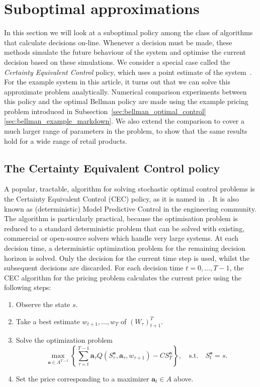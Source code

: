 \documentclass[main.tex]{subfiles}
\begin{document}
\listoftodos

\section{Suboptimal
  approximations}\label{sec:suboptimal_approximations}
In this section we will look at a suboptimal policy among the class of
algorithms that calculate decisions on-line.
Whenever a decision must be made, these methods simulate the future
behaviour of the system and optimise the current decision based on
these simulations.
We consider a special case called the
\emph{Certainty Equivalent Control} policy, which uses a point
estimate of the system~\cite[Ch.~6]{bertsekas2005dynamic}.
For the example system in this article, it turns out that we can solve
this approximate problem analytically.
Numerical comparison experiments between this policy and the optimal
Bellman policy are
made using the example pricing problem introduced in
Subsection~\ref{sec:bellman_optimal_control}\ref{sec:bellman_example_markdown}. We also extend the comparison to
cover a much larger range of parameters in the problem, to show that
the same results hold for a wide range of retail products.

\subsection{The Certainty Equivalent Control policy}
A popular, tractable, algorithm for solving stochastic optimal control
problems is the Certainty Equivalent Control (CEC) policy, as it is
named in~\cite{bertsekas2005dynamic}.
It is also known as (deterministic) Model
Predictive Control in the engineering community.
The algorithm is particularly practical, because the optimisation
problem is reduced to a standard deterministic problem that can
be solved with existing, commercial or open-source solvers which
handle very large systems.
At each decision time, a deterministic optimization problem for the
remaining decision horizon is solved. Only the decision for the
current time step is
used, whilst the subsequent decisions are discarded.
For each decision time $t=0,\dots,T-1$, the CEC algorithm for the pricing
problem calculates the current price using the following steps:
\begin{enumerate}
\item Observe the state $s$.
\item Take a best estimate $w_{t+1},\dots,w_T$ of ${(W_\tau)}_{t+1}^T$.
\item Solve the optimization problem
  \begin{equation}
    \max_{\mathbf a\in A^{T-t}}\left\{\sum_{\tau=t}^{T-1}\mathbf
      a_\tau Q(S_\tau^{\mathbf a},\mathbf
      a_\tau,w_{\tau+1})-CS_T^{\mathbf a}\right\},
    \quad \text{s.t.}\quad S_t^{\mathbf a}=s.
  \end{equation}
\item Set the price corresponding to a maximizer
  $\mathbf a_t\in A$ above.
\end{enumerate}
\end{document}
